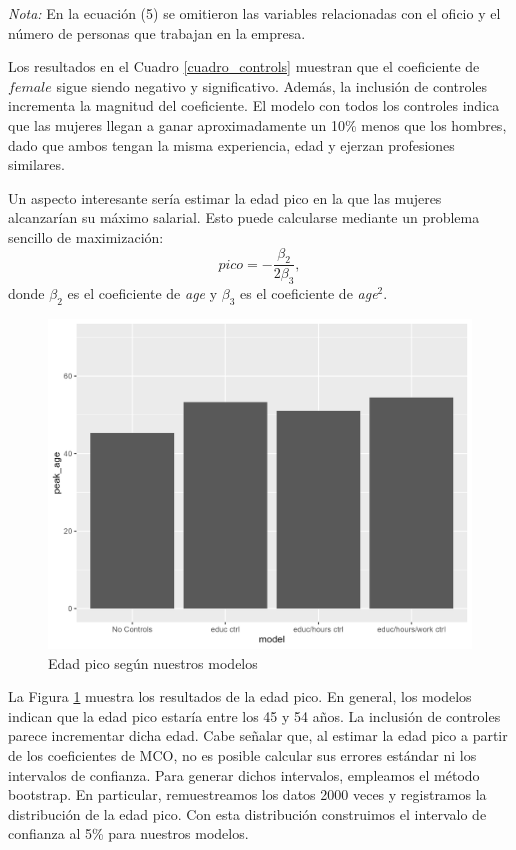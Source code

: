 \documentclass[12pt,a4paper,onecolumn]{article}
\begin{document}
\noindent \textit{Nota:} En la ecuación (5) se omitieron las variables relacionadas con el oficio y el número de personas que trabajan en la empresa.

Los resultados en el Cuadro \ref{cuadro_controls} muestran que el coeficiente de $female$ sigue siendo negativo y significativo. Además, la inclusión de controles incrementa la magnitud del coeficiente. El modelo con todos los controles indica que las mujeres llegan a ganar aproximadamente un 10\% menos que los hombres, dado que ambos tengan la misma experiencia, edad y ejerzan profesiones similares.

Un aspecto interesante sería estimar la edad pico en la que las mujeres alcanzarían su máximo salarial. Esto puede calcularse mediante un problema sencillo de maximización: 
\[
pico = -\frac{\beta_2}{2\beta_3},
\] 
donde $\beta_2$ es el coeficiente de \textit{age} y $\beta_3$ es el coeficiente de \textit{age}$^2$.

\begin{figure}[H]
\caption{Edad pico según nuestros modelos} \label{fig:age_peak_bar}
    \includegraphics[scale=0.75]{../views/age_peak_bar.png}   
 \flushleft
\end{figure}

La Figura \ref{fig:age_peak_bar} muestra los resultados de la edad pico. En general, los modelos indican que la edad pico estaría entre los 45 y 54 años. La inclusión de controles parece incrementar dicha edad. Cabe señalar que, al estimar la edad pico a partir de los coeficientes de MCO, no es posible calcular sus errores estándar ni los intervalos de confianza. Para generar dichos intervalos, empleamos el método bootstrap. En particular, remuestreamos los datos 2000 veces y registramos la distribución de la edad pico. Con esta distribución construimos el intervalo de confianza al 5\% para nuestros modelos.
\end{document}

